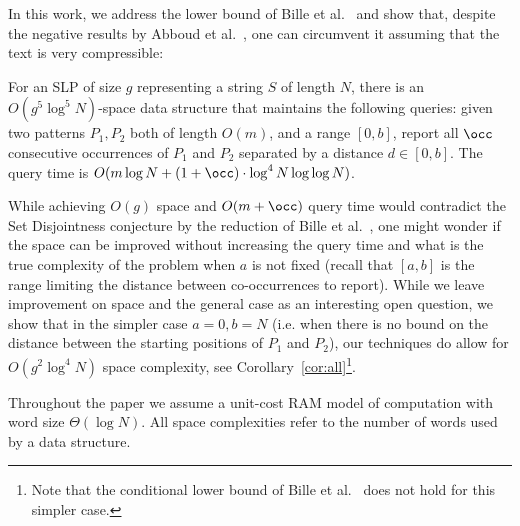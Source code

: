 In this work, we address the lower bound of Bille et al.~\cite{cpm/BilleGPS21} and show that, despite the negative results by Abboud et al.~\cite{AbboudBBK17}, one can circumvent it assuming that the text is very compressible:

\begin{theorem}\label{thm:close_co_occurrences}
For an SLP of size $g$ representing a string $S$ of length $N$, there is an $O(g^5\log^5 N)$-space data structure that maintains the following queries: given two patterns $P_1, P_2$ both of length $O(m)$, and a range $[0,b]$, report all $\occ$ consecutive occurrences of $P_1$ and $P_2$ separated by a distance $d \in [0,b]$. The query time is $O(m\log N + (1+\occ) \cdot \log^4 N \log \log N)$. 
\end{theorem}


While achieving $O(g)$ space and $O(m+\occ)$ query time would contradict the Set Disjointness conjecture by the reduction of Bille et al.~\cite{cpm/BilleGPS21}, one might wonder if the space can be improved without increasing the query time and what is the true complexity of the problem when $a$ is not fixed (recall that $[a,b]$ is the range limiting the distance between co-occurrences to report). While we leave improvement on space and the general case as an interesting open question, we show that in the simpler case $a = 0, b = N$ (i.e. when there is no bound on the distance between the starting positions of $P_1$ and $P_2$), our techniques do allow for $O(g^2\log^4 N)$ space complexity, see Corollary~\ref{cor:all}\footnote{Note that the conditional lower bound of Bille et al.~\cite{cpm/BilleGPS21} does not hold for this simpler case.}.

Throughout the paper we assume a unit-cost RAM model of computation with word size $\Theta(\log N)$. All space
complexities refer to the number of words used by a data structure.
